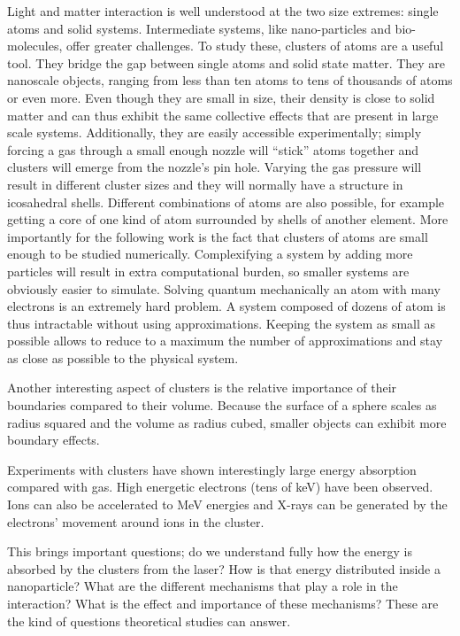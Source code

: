 Light and matter interaction is well understood at the two size extremes:
single atoms and solid systems. Intermediate systems, like nano-particles and
bio-molecules, offer greater challenges. To study these, clusters of atoms are
a useful tool. They bridge the gap between single atoms and solid state
matter. They are nanoscale objects, ranging from less than ten atoms to tens of
thousands of atoms or even more. Even though they are small in size, their
density is close to solid matter and can thus exhibit the same collective
effects that are present in large scale systems. Additionally, they are easily
accessible experimentally; simply forcing a gas through a small enough nozzle
will ``stick'' atoms together and clusters will emerge from the nozzle's pin
hole. Varying the gas pressure will result in different cluster sizes
and they will normally have a structure in icosahedral shells.
Different combinations of atoms are also possible, for example getting a core of
one kind of atom surrounded by shells of another element. More importantly for
the following work is the fact that clusters of atoms are small enough to be
studied numerically. Complexifying a system by adding more particles will
result in extra computational burden, so smaller systems are obviously easier
to simulate. Solving quantum mechanically an atom with many electrons is an
extremely hard problem. A system composed of dozens of atom is thus intractable
without using approximations. Keeping the system as small as possible allows to
reduce to a maximum the number of approximations and stay as close as possible
to the physical system.

Another interesting aspect of clusters is the relative importance of
their boundaries compared to their volume. Because the surface of a sphere
scales as radius squared and the volume as radius cubed, smaller objects can
exhibit more boundary effects.

Experiments with clusters have shown interestingly large energy absorption
compared with gas. High energetic electrons (tens of keV) have been observed.
Ions can also be accelerated to MeV energies and X-rays can be generated by the
electrons' movement around ions in the cluster.

This brings important questions; do we understand fully how the energy is
absorbed by the clusters from the laser? How is that energy distributed
inside a nanoparticle? What are the different mechanisms that play a role in
the interaction? What is the effect and importance of these mechanisms? These
are the kind of questions theoretical studies can answer.


